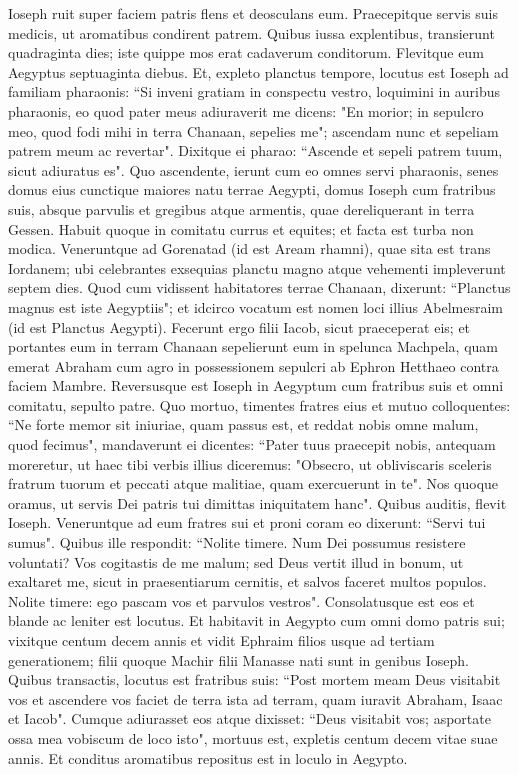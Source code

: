 \begin{biblechapter}  
\verse Ioseph ruit super faciem patris flens et deosculans eum. 
\verse Praecepitque servis suis medicis, ut aromatibus condirent patrem. 
\verse Quibus iussa explentibus, transierunt quadraginta dies; iste quippe mos erat cadaverum conditorum. Flevitque eum Aegyptus septuaginta diebus. 
\verse Et, expleto planctus tempore, locutus est Ioseph ad familiam pharaonis: “Si inveni gratiam in conspectu vestro, loquimini in auribus pharaonis, 
\verse eo quod pater meus adiuraverit me dicens: "En morior; in sepulcro meo, quod fodi mihi in terra Chanaan, sepelies me"; ascendam nunc et sepeliam patrem meum ac revertar". 
\verse Dixitque ei pharao: “Ascende et sepeli patrem tuum, sicut adiuratus es". 
\verse Quo ascendente, ierunt cum eo omnes servi pharaonis, senes domus eius cunctique maiores natu terrae Aegypti, 
\verse domus Ioseph cum fratribus suis, absque parvulis et gregibus atque armentis, quae dereliquerant in terra Gessen.  
\verse Habuit quoque in comitatu currus et equites; et facta est turba non modica.  
\verse Veneruntque ad Gorenatad (id est Aream rhamni), quae sita est trans Iordanem; ubi celebrantes exsequias planctu magno atque vehementi impleverunt septem dies. 
\verse Quod cum vidissent habitatores terrae Chanaan, dixerunt: “Planctus magnus est iste Aegyptiis"; et idcirco vocatum est nomen loci illius Abelmesraim (id est Planctus Aegypti). 
\verse Fecerunt ergo filii Iacob, sicut praeceperat eis; 
\verse et portantes eum in terram Chanaan sepelierunt eum in spelunca Machpela, quam emerat Abraham cum agro in possessionem sepulcri ab Ephron Hetthaeo contra faciem Mambre. 
\verse Reversusque est Ioseph in Aegyptum cum fratribus suis et omni comitatu, sepulto patre. 
\verse Quo mortuo, timentes fratres eius et mutuo colloquentes: “Ne forte memor sit iniuriae, quam passus est, et reddat nobis omne malum, quod fecimus", 
\verse mandaverunt ei dicentes: “Pater tuus praecepit nobis, antequam moreretur,  
\verse ut haec tibi verbis illius diceremus: "Obsecro, ut obliviscaris sceleris fratrum tuorum et peccati atque malitiae, quam exercuerunt in te". Nos quoque oramus, ut servis Dei patris tui dimittas iniquitatem hanc". Quibus auditis, flevit Ioseph. 
\verse Veneruntque ad eum fratres sui et proni coram eo dixerunt: “Servi tui sumus". 
\verse Quibus ille respondit: “Nolite timere. Num Dei possumus resistere voluntati? 
\verse Vos cogitastis de me malum; sed Deus vertit illud in bonum, ut exaltaret me, sicut in praesentiarum cernitis, et salvos faceret multos populos. 
\verse Nolite timere: ego pascam vos et parvulos vestros". Consolatusque est eos et blande ac leniter est locutus. 
\verse Et habitavit in Aegypto cum omni domo patris sui; vixitque centum decem annis 
\verse et vidit Ephraim filios usque ad tertiam generationem; filii quoque Machir filii Manasse nati sunt in genibus Ioseph. 
\verse Quibus transactis, locutus est fratribus suis: “Post mortem meam Deus visitabit vos et ascendere vos faciet de terra ista ad terram, quam iuravit Abraham, Isaac et Iacob". 
\verse Cumque adiurasset eos atque dixisset: “Deus visitabit vos; asportate ossa mea vobiscum de loco isto", 
\verse mortuus est, expletis centum decem vitae suae annis. Et conditus aromatibus repositus est in loculo in Aegypto.    
\end{biblechapter}
